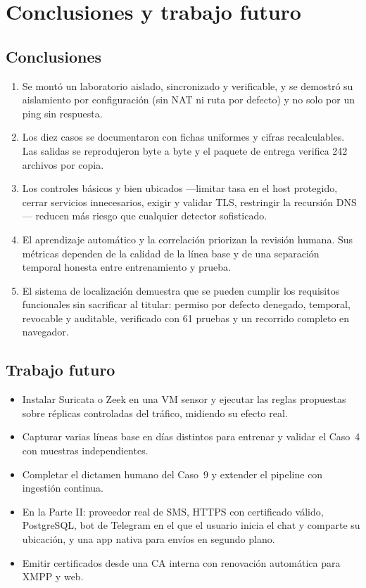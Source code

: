 \chapter{Conclusiones y trabajo futuro}\label{cap:conclusiones}

\section{Conclusiones}
\begin{enumerate}
\item Se montó un laboratorio aislado, sincronizado y verificable, y se demostró su aislamiento por configuración (sin NAT ni ruta por defecto) y no solo por un ping sin respuesta.
\item Los diez casos se documentaron con fichas uniformes y cifras recalculables. Las salidas se reprodujeron byte a byte y el paquete de entrega verifica 242 archivos por copia.
\item Los controles básicos y bien ubicados —limitar tasa en el host protegido, cerrar servicios innecesarios, exigir y validar TLS, restringir la recursión DNS— reducen más riesgo que cualquier detector sofisticado.
\item El aprendizaje automático y la correlación priorizan la revisión humana. Sus métricas dependen de la calidad de la línea base y de una separación temporal honesta entre entrenamiento y prueba.
\item El sistema de localización demuestra que se pueden cumplir los requisitos funcionales sin sacrificar al titular: permiso por defecto denegado, temporal, revocable y auditable, verificado con 61 pruebas y un recorrido completo en navegador.
\end{enumerate}

\section{Trabajo futuro}
\begin{itemize}
\item Instalar Suricata o Zeek en una VM sensor y ejecutar las reglas propuestas sobre réplicas controladas del tráfico, midiendo su efecto real.
\item Capturar varias líneas base en días distintos para entrenar y validar el Caso~4 con muestras independientes.
\item Completar el dictamen humano del Caso~9 y extender el pipeline con ingestión continua.
\item En la Parte II: proveedor real de SMS, HTTPS con certificado válido, PostgreSQL, bot de Telegram en el que el usuario inicia el chat y comparte su ubicación, y una app nativa para envíos en segundo plano.
\item Emitir certificados desde una CA interna con renovación automática para XMPP y web.
\end{itemize}

